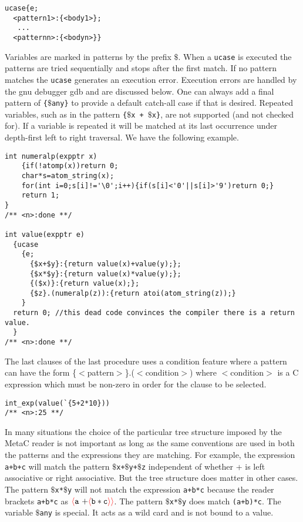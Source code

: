 \documentclass{article}
\newcommand{\fopen}{{\color{red} \langle}}
\newcommand{\fclose}{{\color{red} \rangle}}
\begin{document}
\begin{verbatim}
ucase{e;
  <pattern1>:{<body1>};
   ...
  <patternn>:{<bodyn>}}
\end{verbatim}

Variables are marked in patterns by the prefix $\$$.  When a {\tt ucase} is executed the patterns are tried sequentially and stops after the first match.
If no pattern matches the {\tt ucase} generates an execution error.
Execution errors are handled by the gnu debugger gdb and are discussed below.
One can always add a final pattern of {\tt \{$\$$any\}} to provide a default
catch-all case if that is desired.
Repeated variables, such as in the pattern {\tt \{$\$$x + $\$$x\}}, are not supported (and not checked for).
If a variable is repeated it will be matched at its last occurrence under depth-first left to right traversal.
We have the following example.

\begin{verbatim}
int numeralp(expptr x)
    {if(!atomp(x))return 0;
    char*s=atom_string(x);
    for(int i=0;s[i]!='\0';i++){if(s[i]<'0'||s[i]>'9')return 0;}
    return 1;
}
/** <n>:done **/

int value(expptr e)
  {ucase
    {e;
      {$x+$y}:{return value(x)+value(y);};
      {$x*$y}:{return value(x)*value(y);};
      {($x)}:{return value(x);};
      {$z}.(numeralp(z)):{return atoi(atom_string(z));}
    }
  return 0; //this dead code convinces the compiler there is a return value.
  }
/** <n>:done **/
\end{verbatim}

The last clauses of the last procedure uses a condition feature where a pattern can have the
form \{$<$pattern$>$\}.($<$condition$>$)
where $<$condition$>$ is a C expression which must be non-zero in order for the clause to be selected.

\begin{verbatim}
int_exp(value(`{5+2*10}))
/** <n>:25 **/
\end{verbatim}

In many situations the choice of the particular tree structure imposed by the MetaC reader is not important as long as the same conventions are used in both the patterns and the expressions
they are matching.  For example, the expression {\tt a+b+c} will match the pattern
{\tt $\$$x+$\$$y+$\$$z} independent of whether + is left associative or right associative.  But the tree structure does matter in other cases.  The pattern {\tt $\$$x*$\$$y}
will not match the expression {\tt a+b*c} because the reader brackets {\tt a+b*c} as  $\fopen \mathtt{a~+} \fopen \mathtt{b * c} \fclose\fclose$. The pattern {\tt $\$$x*$\$$y} does match {\tt (a+b)*c}.
The variable {\tt $\$$any} is special.  It acts as a wild card and is not bound to a value.
\end{document}
